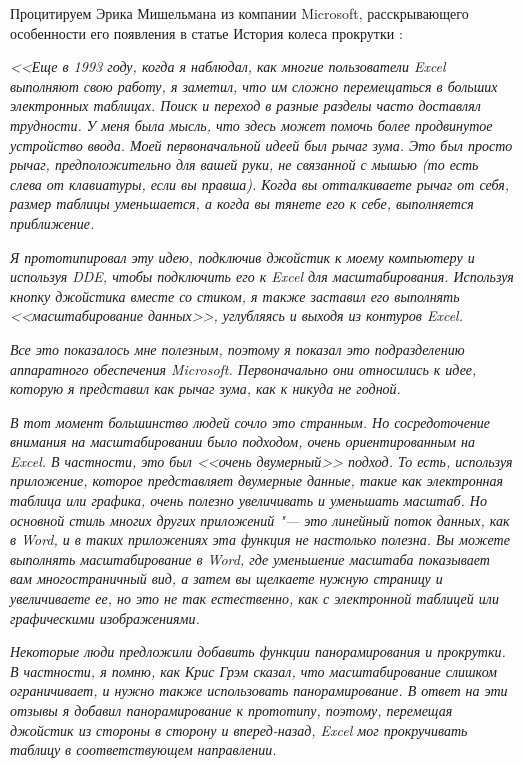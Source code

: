 \documentclass[11pt, a4paper]{article}
\begin{document}
Процитируем Эрика Мишельмана из компании Microsoft, расскрывающего особенности его появления в статье История колеса прокрутки \cite{ink}:

\textit{<<Еще в 1993 году, когда я наблюдал, как многие пользователи Excel выполняют свою работу, я заметил, что им сложно перемещаться в больших электронных таблицах. Поиск и переход в разные разделы часто доставлял трудности. У меня была мысль, что здесь может помочь более продвинутое устройство ввода.
Моей первоначальной идеей был рычаг зума. Это был просто рычаг, предположительно для вашей руки, не связанной с мышью (то есть слева от клавиатуры, если вы правша). Когда вы отталкиваете рычаг от себя, размер таблицы уменьшается, а когда вы тянете его к себе, выполняется приближение.}

\textit{Я прототипировал эту идею, подключив джойстик к моему компьютеру и используя DDE, чтобы подключить его к Excel для масштабирования. Используя кнопку джойстика вместе со стиком, я также заставил его выполнять <<масштабирование данных>>, углубляясь и выходя из контуров Excel.}

\textit{Все это показалось мне полезным, поэтому я показал это подразделению аппаратного обеспечения Microsoft. Первоначально они относились к идее, которую я представил как рычаг зума, как к никуда не годной.}

\textit{В тот момент большинство людей сочло это странным. Но сосредоточение внимания на масштабировании было подходом, очень ориентированным на Excel. В частности, это был <<очень двумерный>> подход. То есть, используя приложение, которое представляет двумерные данные, такие как электронная таблица или графика, очень полезно увеличивать и уменьшать масштаб. Но основной стиль многих других приложений "--- это линейный поток данных, как в Word, и в таких приложениях эта функция не настолько полезна. Вы можете выполнять масштабирование в Word, где уменьшение масштаба показывает вам многостраничный вид, а затем вы щелкаете нужную страницу и увеличиваете ее, но это не так естественно, как с электронной таблицей или графическими изображениями.}

\textit{Некоторые люди предложили добавить функции панорамирования и прокрутки. В частности, я помню, как Крис Грэм сказал, что масштабирование слишком ограничивает, и нужно также использовать панорамирование. В ответ на эти отзывы я добавил панорамирование к прототипу, поэтому, перемещая джойстик из стороны в сторону и вперед-назад, Excel мог прокручивать таблицу в соответствующем направлении.}
\end{document}
